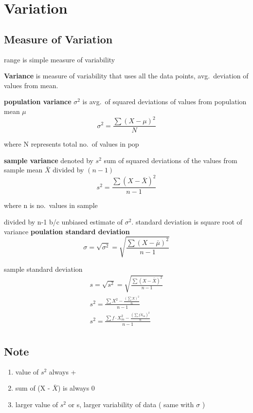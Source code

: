 \documentclass[11pt]{article}
\begin{document}
\section{Variation}
\subsection{Measure of Variation}
\par range is simple measure of variability
\par \textbf{Variance} is measure of variability that uses all the data points,
avg.\ deviation of values from mean.
\par \textbf{population variance} $\sigma^2$ is avg.\ of squared deviations of values from population mean $\mu$
\begin{equation}
  \sigma^2 = \frac{\sum{(X-\mu)^2}}{N}
\end{equation}
\par where N represents total no.\ of values in pop
\par \textbf{sample variance} denoted by $s^2$ sum of squared deviations of the values from sample mean $\bar{X}$ divided by $(n-1)$
\begin{equation}
  s^2 = \frac {\sum{(X-\bar{X})^2}}{n-1}
\end{equation}
\par where n is no.\ values in sample
\par divided by n-1  b/c unbiased estimate of $\sigma^2$. standard deviation is square root of variance
\textbf{poulation standard deviation}
\begin{equation}
  \sigma  = \sqrt{\sigma^2} = \sqrt {\frac{\sum{(X-\bar{\mu})^2}}{n-1}}
\end{equation}
\par sample standard deviation
\begin{equation}
  \begin{split}
    s  = \sqrt{s^2} = \sqrt {\frac{\sum{(X-\bar{X})^2}}{n-1}} \\
    s^2 = \frac{\sum{X^2 - \frac{(\sum X)^2}{n}}}{n-1} \\
    s^2 = \frac{\sum{f \cdot X_m^2 - \frac{(\sum f \dot X_m)^2}{n}}}{n-1} \\
  \end{split}
\end{equation}
\subsection{Note}
\begin{enumerate}
  \item value of $s^2$ always +
  \item sum of (X - $\bar{X}$) is always 0
  \item larger value of $s^2$ or s, larger variability of data ( same with $\sigma$ )
\end{enumerate}
\end{document}
